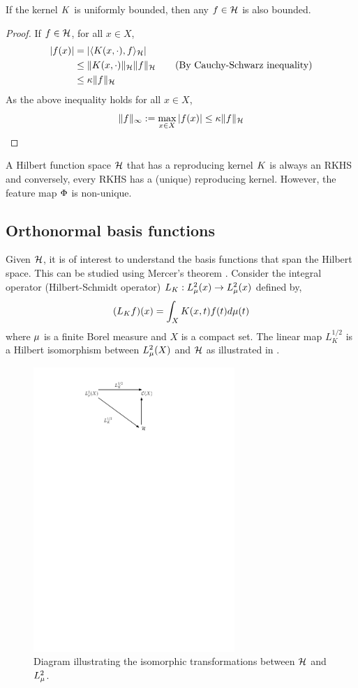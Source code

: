 \begin{proposition}
\label{prop:RKHS_bounded}
	If the kernel $K$ is uniformly bounded, then any $f \in {\cal H}$ is also bounded. 
\end{proposition}
\begin{proof}
	If $f \in {\cal H}$, for all $x \in X$,
	\[
	\begin{aligned}
	|f(x)| &= |\langle K(x,\cdot), f \rangle_{\cal H}| \\
	& \leq \|K(x,\cdot)\|_{\cal H} \|f\|_{\cal H} \qquad{\text{(By Cauchy-Schwarz inequality)}}\\ 
	& \leq \kappa \|f\|_{\cal H}
	\end{aligned}
	\]
	As the above inequality holds for all $x \in X$, 
	\[
	\|f\|_\infty := \max_{x\in X}|f(x)| \leq \kappa \|f\|_{\cal H}
	\]
\end{proof}
A Hilbert function space ${\cal H}$ that has a reproducing kernel $K$ is always an RKHS and conversely, every RKHS has a (unique) reproducing kernel. However, the feature map $\Phi$ is non-unique. 
\subsection{Orthonormal basis functions} 
Given ${\cal H}$, it is of interest to understand the basis functions that span the Hilbert space. This can be studied using Mercer's theorem \cite{merrus09}.
Consider the integral operator (Hilbert-Schmidt operator) $L_K:L^2_\mu(x) \to L^2_\mu(x)$ defined by,
\[
(L_K f)(x) = \int_X K(x,t) f(t) d\mu(t)
\]
where $\mu$ is a finite Borel measure and $X$ is a compact set.
The linear map $L_K^{1/2}$ is a Hilbert isomorphism between $L^2_{\mu}(X)$ and ${\cal H}$ as illustrated in . 

\begin{figure}[htbp]
	\centering
	\includegraphics[width=3in]{images/Chap3_RKHS_isomorphism}
	\caption{Diagram illustrating the isomorphic transformations between ${\cal H}$ and $L^2_\mu$.}
	\label{fig:rkhs_isomorphism}
\end{figure}

